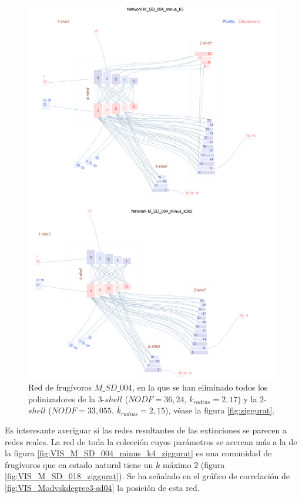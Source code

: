 \clearpage
\begin{figure}[ht!]
\centering
\includegraphics[scale=0.5]{Figures/VIS_M_SD_004_minus_k3k2_ziggurat.png}
\caption {Red de frugívoros $M\_SD\_004$, en la que se han eliminado todos los polinizadores de la $3$-$shell$ ($NODF = 36,24$, $\overline k_{radius} = 2,17$) y la $2$-$shell$ ($NODF = 33,055$, $\overline k_{radius} = 2,15$), véase la figura \ref{fig:ziggurat}.} 
\label{fig:VIS_M_SD_004_minus_k3k2_ziggurat}
\end{figure}

\clearpage
Es interesante averiguar si las redes resultantes de las extinciones se parecen a redes reales. La red de toda la colección cuyos parámetros se acercan más a la de la figura \ref{fig:VIS_M_SD_004_minus_k4_ziggurat} es una comunidad de frugívoros que en estado natural tiene un $k$ máximo $2$ (figura \ref{fig:VIS_M_SD_018_ziggurat}). Se ha señalado en el gráfico de correlación de \ref{fig:VIS_Modvskdegree3-sd04} la posición de esta red.

